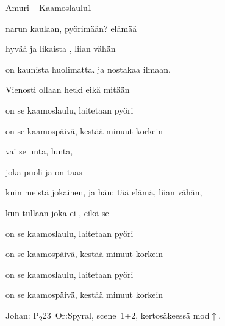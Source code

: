 \documentclass[12pt,a4paper]{article}
\begin{document}
\thispagestyle{empty}
\begin{mysong}{Amuri – Kaamoslaulu}{1}


\begin{SBVerse}
   narun kaulaan,  pyörimään?
   elämää 

  hyvää ja  likaista , liian vähän

   on kaunista  huolimatta. 
  ja nostakaa  ilmaan.

  Vienosti  ollaan hetki  eikä mitään
\end{SBVerse}

\begin{SBChorus}
   on se kaamoslaulu,  laitetaan
   pyöri

   on se kaamospäivä,  kestää 
  minuut korkein
\end{SBChorus}

\begin{SBVerse}
    vai  se unta,
   lunta,

  joka  puoli ja on taas 

   kuin meistä jokainen,  ja hän:  tää
  elämä,  liian vähän,

  kun tullaan  joka ei , eikä se 
\end{SBVerse}

\begin{SBChorus}
   on se kaamoslaulu,  laitetaan
   pyöri

   on se kaamospäivä,  kestää 
  minuut korkein
\end{SBChorus}


\begin{SBChorus}
   on se kaamoslaulu,  laitetaan
   pyöri

   on se kaamospäivä,  kestää 
  minuut korkein
\end{SBChorus}


{\SBLyricNoteFont Johan: P\textsubscript{2}23~Or:Spyral, scene~1+2,
kertosäkeessä mod$\uparrow$.}

\end{mysong}
\end{document}

